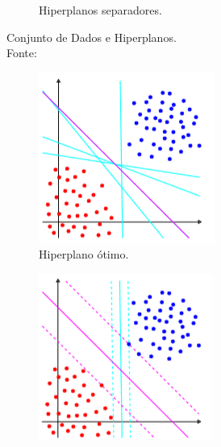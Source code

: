 \documentclass[12pt]{beamer}
\theoremstyle{definition}%
\begin{document}
\begin{frame}
\begin{figure}[h]
\begin{subfigure}[h]{0.38\textwidth}
		\caption{Hiperplanos separadores. \label{fig2:b}}
	\end{subfigure}
	\caption{Conjunto de Dados e Hiperplanos. \label{fig2}
		\\ Fonte: \textcite{Evelin2017}}
\end{figure}
\begin{figure}[h] 
	\centering
	\begin{subfigure}[h]{0.4\textwidth}
		\centering
		\includegraphics[width=\textwidth]{hiperplano_otimo}
		\caption{Hiperplano ótimo. \label{fig3:a}}
	\end{subfigure}
	\begin{subfigure}[h]{0.4\textwidth}
		\centering
		\includegraphics[width=\textwidth]{maxima_margem}

\end{subfigure}
\end{figure}
\end{frame}
\end{document}

